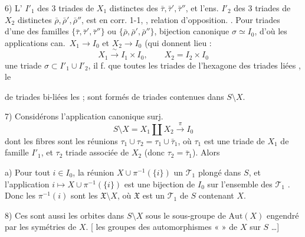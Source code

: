 \documentclass[11pt,a4paper]{article}
\begin{document}
6) L'  $I'_1$ des 3 triades de $X_1$ distinctes des $\bar\tau, \bar\tau', \bar\tau''$, et l'ens. $I'_2$ des 3 triades de $X_2$ distinctes   $\bar\rho, \bar\rho', \bar\rho''$, est en corr. 1-1,  , relation d'opposition. . Pour   triades d'une des familles  $\{\bar\tau, \bar\tau', \bar\tau''\}$ ou $\{\bar\rho, \bar\rho', \bar\rho''\}$, \ill{} bijection canonique $\sigma \simeq I_0$, \struck{\ill{}} \add{\ill{}} d'où les applications can.\ $X_1 \to I_0$ et $X_2 \to I_0$ (qui donnent lieu :
\[
  X_1 \xrightarrow{\ \sim\ } I_1 \times I_0, \qquad X_2 = I_2 \times I_0
\]
  une triade $\sigma \subset I'_1 \cup I'_2$, il f.  \ill{} que toutes les triades de l'hexagone \ill{} des triades liées  , \ill{}  le

\ill{}  de triades bi-liées  \ill{} les  ; sont formés de triades contenues dans $S \setminus X$.

7) Considérons l'application canonique surj.
\[
  S \setminus X = X_1 \amalg X_2 \xrightarrow{\ \pi\ } I_0
\]
dont les fibres sont les réunions $\tau_1 \cup \tau_2 = \tau_1 \cup \bar\tau_1$, où $\tau_1$ est une triade de $X_1$ de famille $I'_1$, et $\tau_2$  \struck{\ill{}} triade associée de $X_2$  (donc $\tau_2 = \bar\tau_1$). Alors

a) Pour tout $i \in I_0$, la réunion $X \cup \pi^{-1}(\{i\})$  \struck{\ill{}} un $\mathcal{T}_1$ plongé dans $S$, et l'application $i \mapsto X \cup \pi^{-1}(\{i\})$ est une bijection de $I_0$ sur l'ensemble des $\mathcal{T}_1$ . Donc les $\pi^{-1}(i)$ sont les $\mathfrak{X} \setminus X$, où $\mathfrak{X}$ est un $\mathcal{T}_1$ de $S$ contenant $X$.

8) Ces  sont aussi les orbites dans $S \setminus X$ sous le sous-groupe de $\mathrm{Aut}(X)$ engendré par les symétries \struck{\ill{}} \add{\ill{}}  de $X$. [ les groupes des automorphismes « \ill{} » de $X$  sur $S$ …]
\end{document}
